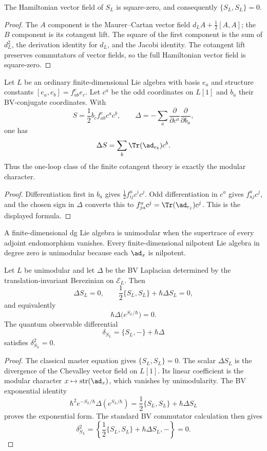 \begin{theorem}
The Hamiltonian vector field of $S_L$ is square-zero, and consequently $\{S_L,S_L\}=0$.
\end{theorem}
\begin{proof}
The $A$ component is the Maurer--Cartan vector field $d_LA+\frac12[A,A]$; the $B$ component is its cotangent lift. The square of the first component is the sum of $d_L^2$, the derivation identity for $d_L$, and the Jacobi identity. The cotangent lift preserves commutators of vector fields, so the full Hamiltonian vector field is square-zero.
\end{proof}

\begin{proposition}
Let $L$ be an ordinary finite-dimensional Lie algebra with basis $e_a$ and structure constants $[e_a,e_b]=f^c_{ab}e_c$. Let $c^a$ be the odd coordinates on $L[1]$ and $b_a$ their BV-conjugate coordinates. With
\[
 S=\frac12 b_c f^c_{ab}c^ac^b,
 \qquad
 \Delta=-\sum_a\frac{\partial}{\partial c^a}
                 \frac{\partial}{\partial b_a},
\]
one has
\[
 \Delta S=\sum_b\Tr(\ad_{e_b})c^b.
\]
Thus the one-loop class of the finite cotangent theory is exactly the modular character.
\end{proposition}
\begin{proof}
Differentiation first in $b_a$ gives $\frac12f^a_{ij}c^ic^j$. Odd differentiation in $c^a$ gives $f^a_{aj}c^j$, and the chosen sign in $\Delta$ converts this to $f^a_{ja}c^j=\Tr(\ad_{e_j})c^j$. This is the displayed formula.
\end{proof}

A finite-dimensional dg Lie algebra is unimodular when the supertrace of every adjoint endomorphism vanishes. Every finite-dimensional nilpotent Lie algebra in degree zero is unimodular because each $\ad_x$ is nilpotent.

\begin{theorem}
Let $L$ be unimodular and let $\Delta$ be the BV Laplacian determined by the translation-invariant Berezinian on $\mathcal E_L$. Then
\[
 \Delta S_L=0,
 \qquad
 \frac12\{S_L,S_L\}+\hbar\Delta S_L=0,
\]
and equivalently
\[
 \hbar\Delta\bigl(e^{S_L/\hbar}\bigr)=0.
\]
The quantum observable differential
\[
 \delta_{S_L}=\{S_L,-\}+\hbar\Delta
\]
satisfies $\delta_{S_L}^2=0$.
\end{theorem}
\begin{proof}
The classical master equation gives $\{S_L,S_L\}=0$. The scalar $\Delta S_L$ is the divergence of the Chevalley vector field on $L[1]$. Its linear coefficient is the modular character $x\mapsto\operatorname{str}(\ad_x)$, which vanishes by unimodularity. The BV exponential identity
\[
 \hbar^2e^{-S_L/\hbar}\Delta(e^{S_L/\hbar})
 =\frac12\{S_L,S_L\}+\hbar\Delta S_L
\]
proves the exponential form. The standard BV commutator calculation then gives
\[
 \delta_{S_L}^2=\left\{\frac12\{S_L,S_L\}+\hbar\Delta S_L,-\right\}=0.
\]
\end{proof}

